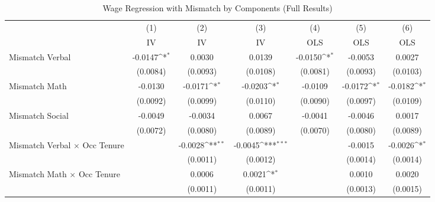 {
\def\sym#1{\ifmmode^{#1}\else\(^{#1}\)\fi}
\begin{longtable}{l*{6}{c}}
\caption{Wage Regression with Mismatch by Components (Full Results)}\\
\hline  \endfirsthead\hline  \endhead\hline  \endfoot\endlastfoot
                    &\multicolumn{1}{c}{(1)}&\multicolumn{1}{c}{(2)}&\multicolumn{1}{c}{(3)}&\multicolumn{1}{c}{(4)}&\multicolumn{1}{c}{(5)}&\multicolumn{1}{c}{(6)}\\
                    &\multicolumn{1}{c}{IV}&\multicolumn{1}{c}{IV}&\multicolumn{1}{c}{IV}&\multicolumn{1}{c}{OLS}&\multicolumn{1}{c}{OLS}&\multicolumn{1}{c}{OLS}\\
\hline  
Mismatch Verbal     &     -0.0147\sym{*}  &      0.0030         &      0.0139         &     -0.0150\sym{*}  &     -0.0053         &      0.0027         \\
                    &    (0.0084)         &    (0.0093)         &    (0.0108)         &    (0.0081)         &    (0.0093)         &    (0.0103)         \\
Mismatch Math       &     -0.0130         &     -0.0171\sym{*}  &     -0.0203\sym{*}  &     -0.0109         &     -0.0172\sym{*}  &     -0.0182\sym{*}  \\
                    &    (0.0092)         &    (0.0099)         &    (0.0110)         &    (0.0090)         &    (0.0097)         &    (0.0109)         \\
Mismatch Social     &     -0.0049         &     -0.0034         &      0.0067         &     -0.0041         &     -0.0046         &      0.0017         \\
                    &    (0.0072)         &    (0.0080)         &    (0.0089)         &    (0.0070)         &    (0.0080)         &    (0.0089)         \\
Mismatch Verbal $\times$ Occ Tenure&                     &     -0.0028\sym{**} &     -0.0045\sym{***}&                     &     -0.0015         &     -0.0026\sym{*}  \\
                    &                     &    (0.0011)         &    (0.0012)         &                     &    (0.0014)         &    (0.0014)         \\
Mismatch Math $\times$ Occ Tenure&                     &      0.0006         &      0.0021\sym{*}  &                     &      0.0010         &      0.0020         \\
                    &                     &    (0.0011)         &    (0.0011)         &                     &    (0.0013)         &    (0.0015)         \\

\end{longtable}}
